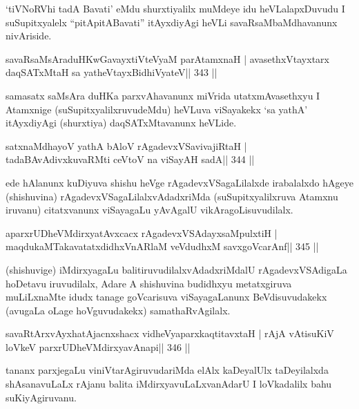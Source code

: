 \begin{artha}
`tiVNoRVhi tadA Bavati' eMdu shurxtiyalilx muMdeye idu heVLalapxDuvudu I suSupitxyalelx ``pitA\s pitABavati'' itAyxdiyAgi heVLi savaRsaMbaMdhavanunx nivAriside.
\end{artha}

\begin{shl}
savaRsaMsAraduHKwGavayxtiVteVyaM parA\s\s tamxnaH |
avasethxVtayxtarx daqSATxMtaH sa yatheVtayxBidhiVyateV\hfill || 343 ||
\end{shl}

\begin{artha}
samasatx saMsAra duHKa parxvAhavanunx miVrida utatxmAvasethxyu I  Atamxnige (suSupitxyalilxruvudeMdu) heVLuva viSayakekx `sa yathA' itAyxdiyAgi (shurxtiya) daqSATxMtavanunx heVLide.
\end{artha}

\begin{shl}
satxnaMdhayoV yathA bAloV rAgadevxVSavivajiRtaH |
tadaBAvAdivxkuvaRMti ceVtoV na viSayAH sadA\hfill || 344 ||
\end{shl}

\begin{artha}
ede hAlanunx kuDiyuva shishu heVge rAgadevxVSagaLilalxde irabalalxdo hAgeye (shishuvina) rAgadevxVSagaLilalxvAdadxriMda (suSupitxyalilxruva Atamxnu iruvanu) citatxvanunx viSayagaLu yAvAgalU vikAragoLisuvudilalx.
\end{artha}

\begin{shl}
aparxrUDheVMdirxyatAvxcacx rAgadevxVSAdayxsaMpulxtiH |
maqdukaMTakavatatxdidhxVnARlaM veVdudhxM savxgoVcarAnf\hfill || 345 ||
\end{shl}

\begin{artha}
(shishuvige) iMdirxyagaLu balitiruvudilalxvAdadxriMdalU rAgadevxVSAdigaLa hoDetavu iruvudilalx, Adare A shishuvina budidhxyu metatxgiruva muLiLxnaMte idudx tanage goVcarisuva viSayagaLanunx BeVdisuvudakekx (avugaLa oLage hoVguvudakekx) samathaRvAgilalx.
\end{artha}


\begin{shl}
savaRtArxvAyxhatAjacnxshacx vidheVyaparxkaqtitavxtaH |
rAjA vA\s tisuKiV loVkeV parxrUDheVMdirxyavAnapi\hfill || 346 ||
\end{shl}

\begin{artha}
tananx parxjegaLu viniVtarAgiruvudariMda elAlx kaDeyalUlx taDeyilalxda shAsanavuLaLx rAjanu balita iMdirxyavuLaLxvanAdarU I loVkadalilx bahu suKiyAgiruvanu.
\end{artha}

